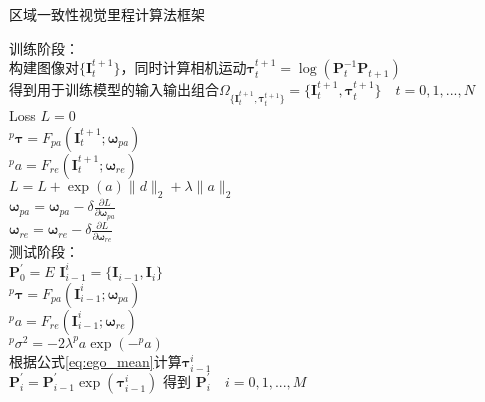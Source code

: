 \begin{algorithm}
  \caption{区域一致性视觉里程计算法框架}
  训练阶段：\\
  构建图像对$\{\mathbf{I}_t^{t+1}\}$，同时计算相机运动$\mathbf{\tau}_t^{t+1} = \log(\mathbf{P}_t^{-1}\mathbf{P}_{t+1})$\\
  得到用于训练模型的输入输出组合$\Omega_{\{\mathbf{I}_t^{t+1},\mathbf{\tau}_t^{t+1}\}}=\{\mathbf{I}_t^{t+1},\mathbf{\tau}_t^{t+1}\}\quad t=0,1,...,N$\\

  {   
      {
        Loss $L = 0$\\
        {
          $^p\mathbf{\tau} =F_{pa}(\mathbf{I}_t^{t+1};\mathbf{\omega}_{pa})$ \\
          $^pa =F_{re}(\mathbf{I}_t^{t+1};\mathbf{\omega}_{re})$ \\
          $L = L + \exp(a)\|d\|_2+ \lambda\|a\|_2$ \\

        }
      }
      $\mathbf{\omega}_{pa} = \mathbf{\omega}_{pa} - \delta \frac{\partial L}{\partial \mathbf{\omega}_{pa}}$\\
      $\mathbf{\omega}_{re} = \mathbf{\omega}_{re} - \delta \frac{\partial L}{\partial \mathbf{\omega}_{re}}$\\
  }
  测试阶段：\\
  $\mathbf{P}_0^{'} = E$
  {
    $\mathbf{I}_{i-1}^{i} = \{\mathbf{I}_{i-1},\mathbf{I}_{i}\}$\\
    {
      $^p\mathbf{\tau} =F_{pa}(\mathbf{I}_{i-1}^{i};\mathbf{\omega}_{pa})$ \\
      $^pa =F_{re}(\mathbf{I}_{i-1}^{i};\mathbf{\omega}_{re})$ \\
      $ ^p\sigma^2= -2\lambda ^pa \exp(-^pa)$\\
    }
    根据公式\eqref{eq:ego_mean}计算$\mathbf{\tau}_{i-1}^{i}$\\
    $\mathbf{P}_i^{'} =\mathbf{P}_{i-1}^{'}\exp(\mathbf{\tau}_{i-1}^{i})$
  }
  得到 $\mathbf{P}_i^{'} \quad i = 0,1,...,M$
\label{alg:padvo}
\end{algorithm}


